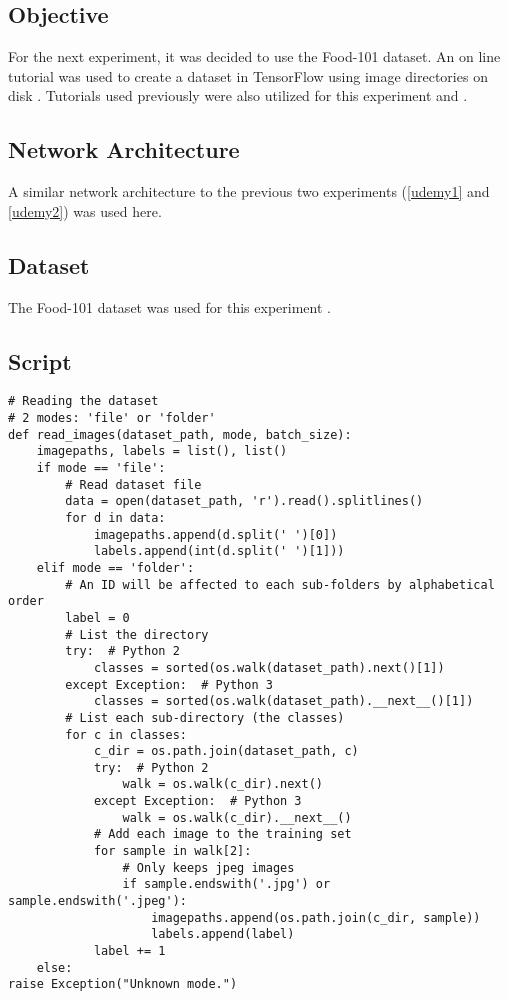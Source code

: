 \subsection*{Objective}
For the next experiment, it was decided to use the Food-101 dataset.
An on line tutorial was used to create a dataset in TensorFlow using image directories on disk \parencite{file_dir_code}.
Tutorials used previously were also utilized for this experiment \parencite{udemy} and \parencite{cifar}.

\subsection*{Network Architecture}
A similar network architecture to the previous two experiments (\ref{udemy1} and \ref{udemy2}) was used here.

\subsection*{Dataset}
The Food-101 dataset was used for this experiment \parencite{food101}.

\subsection*{Script}
\begin{lstlisting}[style=Python]
# Reading the dataset
# 2 modes: 'file' or 'folder'
def read_images(dataset_path, mode, batch_size):
    imagepaths, labels = list(), list()
    if mode == 'file':
        # Read dataset file
        data = open(dataset_path, 'r').read().splitlines()
        for d in data:
            imagepaths.append(d.split(' ')[0])
            labels.append(int(d.split(' ')[1]))
    elif mode == 'folder':
        # An ID will be affected to each sub-folders by alphabetical order
        label = 0
        # List the directory
        try:  # Python 2
            classes = sorted(os.walk(dataset_path).next()[1])
        except Exception:  # Python 3
            classes = sorted(os.walk(dataset_path).__next__()[1])
        # List each sub-directory (the classes)
        for c in classes:
            c_dir = os.path.join(dataset_path, c)
            try:  # Python 2
                walk = os.walk(c_dir).next()
            except Exception:  # Python 3
                walk = os.walk(c_dir).__next__()
            # Add each image to the training set
            for sample in walk[2]:
                # Only keeps jpeg images
                if sample.endswith('.jpg') or sample.endswith('.jpeg'):
                    imagepaths.append(os.path.join(c_dir, sample))
                    labels.append(label)
            label += 1
    else:
raise Exception("Unknown mode.")
\end{lstlisting}

